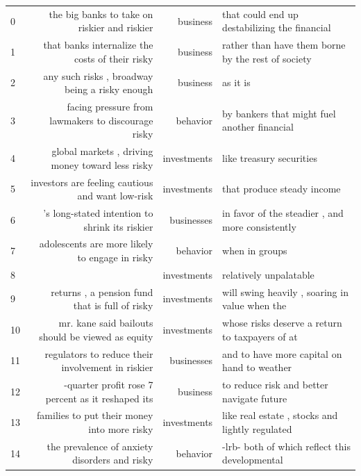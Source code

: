 \begin{table}
\centering
\scriptsize
\ttfamily
\begin{tabular}{lrrl}

\midrule
0  &        the big banks to take on riskier and riskier  &     business &        that could end up destabilizing the financial \\
1  &     that banks internalize the costs of their risky  &     business &   rather than have them borne by the rest of society \\
2  &      any such risks , broadway being a risky enough  &     business &                                             as it is \\
3  &  facing pressure from lawmakers to discourage risky  &     behavior &         by bankers that might fuel another financial \\
4  &    global markets , driving money toward less risky  &  investments &                             like treasury securities \\
5  &    investors are feeling cautious and want low-risk  &  investments &                           that produce steady income \\
6  &      's long-stated intention to shrink its riskier  &   businesses &     in favor of the steadier , and more consistently \\
7  &      adolescents are more likely to engage in risky  &     behavior &                                       when in groups \\
8  &                                                      &  investments &                               relatively unpalatable \\
9  &      returns , a pension fund that is full of risky  &  investments &       will swing heavily , soaring in value when the \\
10 &   mr. kane said bailouts should be viewed as equity  &  investments &      whose risks deserve a return to taxpayers of at \\
11 &   regulators to reduce their involvement in riskier  &   businesses &          and to have more capital on hand to weather \\
12 &   -quarter profit rose 7 percent as it reshaped its  &     business &            to reduce risk and better navigate future \\
13 &         families to put their money into more risky  &  investments &      like real estate , stocks and lightly regulated \\
14 &       the prevalence of anxiety disorders and risky  &     behavior &       -lrb- both of which reflect this developmental \\

\end{tabular}
\end{table}
